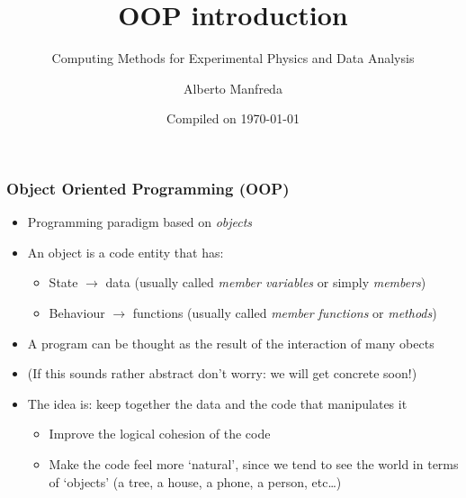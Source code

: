 \documentclass[9pt]{beamer}
\title{OOP introduction}
\subtitle{Computing Methods for Experimental Physics and Data Analysis}
\date{Compiled on \today}
\author{Alberto Manfreda}
\institute[INFN]{INFN--Pisa}
\begin{document}
\titleframe


\begin{frame}
  \frametitle{Object Oriented Programming (OOP)}
  
  \begin{itemize}
    \item Programming paradigm based on \emph{objects}
    \medskip
    \item An object is a code entity that has:
    \smallskip
    \begin{itemize}
      \item \alert{State} $\rightarrow$ data (usually called \emph{member variables} or simply \emph{members})
      \smallskip
      \item \alert{Behaviour} $\rightarrow$ functions (usually called \emph{member functions} or \emph{methods})
    \end{itemize}
    \smallskip
    \item A program can be thought as the result of the interaction of many obects
    \smallskip
    \item (If this sounds rather abstract don't worry: we will get concrete soon!)
    \medskip

    \medskip
    \item The idea is: keep together the data and the code that manipulates it
    \smallskip
    \begin{itemize}
      \item Improve the logical cohesion of the code
      \smallskip
      \item Make the code feel more `natural', since we tend to see the world 
            in terms of `objects' (a tree, a house, a phone, a person, etc\dots) 
    \end{itemize}

  \end{itemize}
\end{frame}
\end{document}
